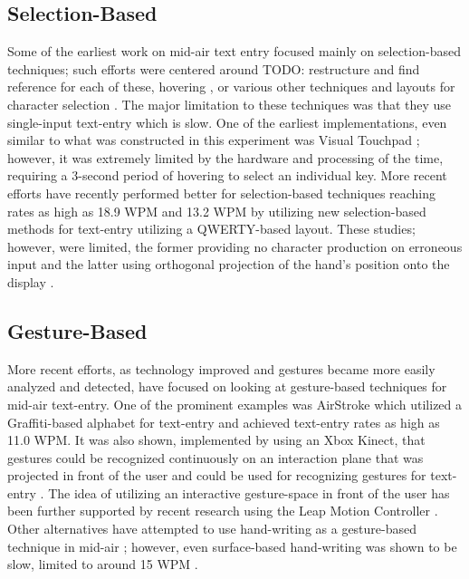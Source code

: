 \subsection{Selection-Based}
Some of the earliest work on mid-air text entry focused mainly on selection-based techniques; such efforts were centered around TODO: restructure and find reference for each of these, hovering \cite{ref_visual_touchpad}, or various other techniques and layouts for character selection \cite{ref_mid_air_text_large_displays,ref_selection_based_mid_air}. The major limitation to these techniques was that they use single-input text-entry which is slow. One of the earliest implementations, even similar to what was constructed in this experiment was Visual Touchpad \cite{ref_visual_touchpad}; however, it was extremely limited by the hardware and processing of the time, requiring a 3-second period of hovering to select an individual key. More recent efforts have recently performed better for selection-based techniques reaching rates as high as 18.9 WPM \cite{ref_mid_air_text_large_displays} and 13.2 WPM \cite{ref_selection_based_mid_air} by utilizing new selection-based methods for text-entry utilizing a QWERTY-based layout. These studies; however, were limited, the former providing no character production on erroneous input \cite{ref_mid_air_text_large_displays} and the latter using orthogonal projection of the hand's position onto the display \cite{ref_selection_based_mid_air}.

\subsection{Gesture-Based}
More recent efforts, as technology improved and gestures became more easily analyzed and detected, have focused on looking at gesture-based techniques for mid-air text-entry. One of the prominent examples was AirStroke \cite{ref_airstroke} which utilized a Graffiti-based alphabet for text-entry and achieved text-entry rates as high as 11.0 WPM. It was also shown, implemented by using an Xbox Kinect, that gestures could be recognized continuously on an interaction plane that was projected in front of the user \cite{ref_continuous_recognition} and could be used for recognizing gestures for text-entry \cite{ref_graffiti_vs_unistroke}. The idea of utilizing an interactive gesture-space in front of the user has been further supported by recent research using the Leap Motion Controller \cite{ref_alvin_thesis,ref_darren_thesis}. Other alternatives have attempted to use hand-writing as a gesture-based technique in mid-air \cite{ref_air_handwriting,ref_air_writing_continuous_recognition,ref_mid_air_text_entry_handwriting,ref_detecting_handwritten_characters}; however, even surface-based hand-writing was shown to be slow, limited to around 15 WPM \cite{ref_handprinting_alternatives}.

